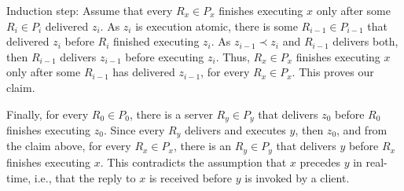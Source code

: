 \documentclass[10pt, conference, compsocconf, letterpaper]{IEEEtranv17}
\begin{document}
Induction step: Assume that every $R_x \in P_x$ finishes executing $x$ only after some $R_i \in P_i$ delivered $z_i$. As $z_i$ is execution atomic, there is some $R_{i-1} \in P_{i-1}$ that delivered $z_i$ before $R_i$ finished executing $z_i$. As $z_{i-1} \prec z_i$ and $R_{i-1}$ delivers both, then $R_{i-1}$ delivers $z_{i-1}$ before executing $z_i$. Thus, $R_x \in P_x$ finishes executing $x$ only after some $R_{i-1}$ has delivered $z_{i-1}$, for every $R_x \in P_x$. This proves our claim.

Finally, for every $R_0 \in P_0$, there is a server $R_y \in P_y$ that delivers $z_0$ before $R_0$ finishes executing $z_0$. Since every $R_y$ delivers and executes $y$, then $z_0$, and from the claim above, for every $R_x \in P_x$, there is an $R_y \in P_y$ that delivers $y$ before $R_x$ finishes executing $x$. This contradicts the assumption that $x$ precedes $y$ in real-time, i.e., that the reply to $x$ is received before $y$ is invoked by a client.


\end{document}

